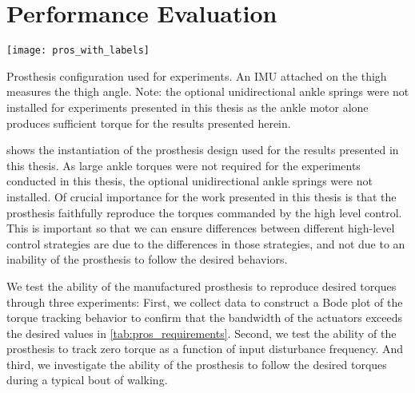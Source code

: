 \section{Performance Evaluation}\label{sec:pros_perf_eval}

\begin{marginfigure}[-1in]
\centerline{\texttt{[image: pros\_with\_labels]}}
\caption[Prosthesis configuration used for experiments]{Prosthesis configuration
used for experiments. An IMU attached on the thigh measures the thigh angle.
Note: the optional unidirectional ankle springs were not installed for
experiments presented in this thesis as the ankle motor alone produces
sufficient torque for the results presented
herein.}\label{fig:prosthesis_actual}
\end{marginfigure}

 shows the instantiation of the prosthesis design
used for the results presented in this thesis. As large ankle torques were not
required for the experiments conducted in this thesis, the optional
unidirectional ankle springs were not installed. Of crucial importance for the
work presented in this thesis is that the prosthesis faithfully reproduce the
torques commanded by the high level control. This is important so that we can
ensure differences between different high-level control strategies are due to
the differences in those strategies, and not due to an inability of the
prosthesis to follow the desired behaviors.

We test the ability of the manufactured prosthesis to reproduce desired torques
through three experiments: First, we collect data to construct a Bode plot of
the torque tracking behavior to confirm that the bandwidth of the actuators
exceeds the desired values in \cref{tab:pros_requirements}.  Second, we test the
ability of the prosthesis to track zero torque as a function of input
disturbance frequency. And third, we investigate the ability of the prosthesis
to follow the desired torques during a typical bout of walking.

